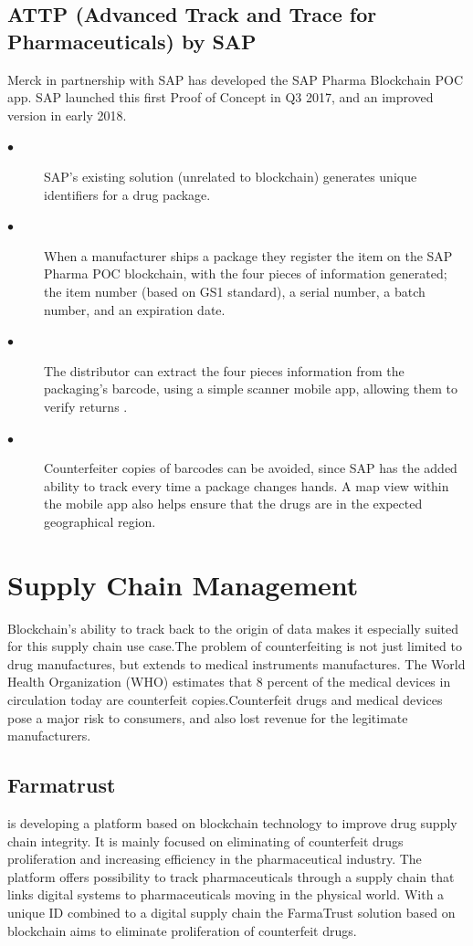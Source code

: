 \documentclass[12pt]{report}
\begin{document}
\subsection{ATTP (Advanced Track and Trace for Pharmaceuticals) by SAP \cite{15}}
Merck in partnership with SAP has developed the SAP Pharma Blockchain POC app. SAP launched this first Proof of Concept in Q3 2017, and an improved version in early 2018.
\begin{description}
\item[$\bullet$]SAP’s existing solution (unrelated to blockchain) generates unique identifiers for a drug package.
\item[$\bullet$]When a manufacturer ships a package they register the item on the SAP Pharma POC blockchain, with the four pieces of information generated; the item number (based on GS1 standard), a serial number, a batch number, and an expiration date.
\item[$\bullet$]The distributor can extract the four pieces information from the packaging’s barcode, using a simple scanner mobile app, allowing them to verify returns .
\item[$\bullet$]Counterfeiter copies of barcodes can be avoided, since SAP has the added ability to track every time a package changes hands. A map view within the mobile app also helps ensure that the drugs are in the expected geographical region.
\end{description}
\section{Supply Chain Management}
Blockchain’s ability to track back to the origin of data makes it especially suited for this supply chain use case.The problem of counterfeiting is not just limited to drug manufactures, but extends to medical instruments manufactures. The World Health Organization (WHO) estimates that 8 percent of the medical devices in circulation today are counterfeit copies.Counterfeit drugs and medical devices pose a major risk to consumers, and also lost revenue for the legitimate manufacturers.
\subsection{Farmatrust \cite{16}}
is developing a platform based on blockchain technology to improve drug supply chain integrity. It is mainly focused on eliminating of counterfeit drugs proliferation and increasing efficiency in the pharmaceutical industry. The platform offers possibility to track pharmaceuticals through a supply chain that links digital systems to pharmaceuticals moving in the physical world. With a unique ID combined to a digital supply chain the FarmaTrust solution based on blockchain aims to eliminate proliferation of counterfeit drugs.
 
\end{document}
